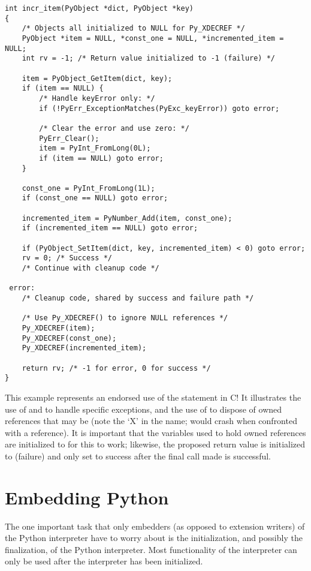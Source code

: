 \documentclass[twoside]{report}
\begin{document}
\begin{verbatim}
int incr_item(PyObject *dict, PyObject *key)
{
    /* Objects all initialized to NULL for Py_XDECREF */
    PyObject *item = NULL, *const_one = NULL, *incremented_item = NULL;
    int rv = -1; /* Return value initialized to -1 (failure) */

    item = PyObject_GetItem(dict, key);
    if (item == NULL) {
        /* Handle keyError only: */
        if (!PyErr_ExceptionMatches(PyExc_keyError)) goto error;

        /* Clear the error and use zero: */
        PyErr_Clear();
        item = PyInt_FromLong(0L);
        if (item == NULL) goto error;
    }

    const_one = PyInt_FromLong(1L);
    if (const_one == NULL) goto error;

    incremented_item = PyNumber_Add(item, const_one);
    if (incremented_item == NULL) goto error;

    if (PyObject_SetItem(dict, key, incremented_item) < 0) goto error;
    rv = 0; /* Success */
    /* Continue with cleanup code */

 error:
    /* Cleanup code, shared by success and failure path */

    /* Use Py_XDECREF() to ignore NULL references */
    Py_XDECREF(item);
    Py_XDECREF(const_one);
    Py_XDECREF(incremented_item);

    return rv; /* -1 for error, 0 for success */
}
\end{verbatim}

This example represents an endorsed use of the  statement 
in C!  It illustrates the use of  and 
 to handle specific exceptions, and the use of 
 to dispose of owned references that may be 
\NULL{} (note the `X' in the name;  would crash 
when confronted with a \NULL{} reference).  It is important that 
the variables used to hold owned references are initialized to 
\NULL{} for this to work; likewise, the proposed return value is 
initialized to  (failure) and only set to success after
the final call made is successful.


\section{Embedding Python}

The one important task that only embedders (as opposed to extension
writers) of the Python interpreter have to worry about is the
initialization, and possibly the finalization, of the Python
interpreter.  Most functionality of the interpreter can only be used
after the interpreter has been initialized.
\end{document}

